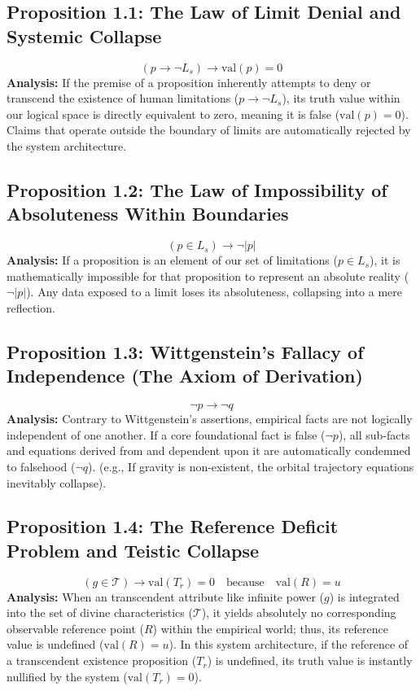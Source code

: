 \documentclass{article}
\begin{document}
\subsection{Proposition 1.1: The Law of Limit Denial and Systemic Collapse}
\[ (p \rightarrow \neg L_s) \rightarrow \text{val}(p) = 0 \]
\textbf{Analysis:} If the premise of a proposition inherently attempts to deny or transcend the existence of human limitations ($p \rightarrow \neg L_s$), its truth value within our logical space is directly equivalent to zero, meaning it is false ($\text{val}(p) = 0$). Claims that operate outside the boundary of limits are automatically rejected by the system architecture.

\subsection{Proposition 1.2: The Law of Impossibility of Absoluteness Within Boundaries}
\[ (p \in L_s) \rightarrow \neg |p| \]
\textbf{Analysis:} If a proposition is an element of our set of limitations ($p \in L_s$), it is mathematically impossible for that proposition to represent an absolute reality ($\neg |p|$). Any data exposed to a limit loses its absoluteness, collapsing into a mere reflection.

\subsection{Proposition 1.3: Wittgenstein's Fallacy of Independence (The Axiom of Derivation)}
\[ \neg p \rightarrow \neg q \]
\textbf{Analysis:} Contrary to Wittgenstein's assertions, empirical facts are not logically independent of one another. If a core foundational fact is false ($\neg p$), all sub-facts and equations derived from and dependent upon it are automatically condemned to falsehood ($\neg q$). (e.g., If gravity is non-existent, the orbital trajectory equations inevitably collapse).

\subsection{Proposition 1.4: The Reference Deficit Problem and Teistic Collapse}
\[ (g \in \mathcal{T}) \rightarrow \text{val}(T_r) = 0 \quad \text{because} \quad \text{val}(R) = u \]
\textbf{Analysis:} When an transcendent attribute like infinite power ($g$) is integrated into the set of divine characteristics ($\mathcal{T}$), it yields absolutely no corresponding observable reference point ($R$) within the empirical world; thus, its reference value is undefined ($\text{val}(R) = u$). In this system architecture, if the reference of a transcendent existence proposition ($T_r$) is undefined, its truth value is instantly nullified by the system ($\text{val}(T_r) = 0$).
\end{document}
